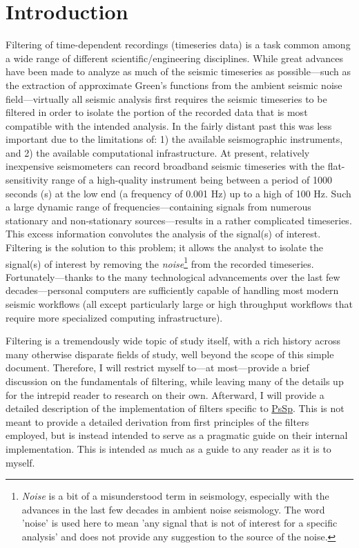 \documentclass[american, twoside]{article}
\begin{document}
\section{Introduction} \label{Introduction}
Filtering of time-dependent recordings (timeseries data) is a task common among a wide range of different scientific/engineering disciplines.
While great advances have been made to analyze as much of the seismic timeseries as possible---such as the extraction of approximate
Green's functions from the ambient seismic noise field---virtually all seismic analysis first requires the seismic timeseries to
be filtered in order to isolate the portion of the recorded data that is most compatible with the intended analysis. In the fairly
distant past this was less important due to the limitations of: 1) the available seismographic instruments, and 2) the available
computational infrastructure. At present, relatively inexpensive seismometers can record broadband seismic timeseries with the flat-sensitivity
range of a high-quality instrument being between a period of 1000 seconds (s) at the low end (a frequency of 0.001 Hz) up to a high
of 100 Hz. Such a large dynamic range of frequencies---containing signals from numerous stationary and non-stationary sources---results in a
rather complicated timeseries. This excess information convolutes the analysis of the signal(s) of interest.
Filtering is the solution to this problem; it allows the analyst to isolate the signal(s) of interest by removing the \textit{noise}\footnote{\textit{Noise} is a bit of a misunderstood term in
seismology, especially with the advances in the last few decades in ambient noise seismology. The word 'noise' is used here to mean 'any
signal that is not of interest for a specific analysis' and does not provide any suggestion to the source of the noise.} from the
recorded timeseries. Fortunately---thanks to the many technological advancements over the last few decades---personal computers are sufficiently
capable of handling most modern seismic workflows (all except particularly large or high throughput workflows that require more specialized
computing infrastructure).

Filtering is a tremendously wide topic of study itself, with a rich history across many otherwise disparate fields of study, well
beyond the scope of this simple document. Therefore, I will restrict myself to---at most---provide a brief discussion
on the fundamentals of filtering, while leaving many of the details up for the intrepid reader to research on their own. Afterward,
I will provide a detailed description of the implementation of filters specific to \href{https://github.com/arbCoding/PsSp}{PsSp}.
This is not meant to provide a detailed derivation from first principles of the filters employed, but is instead intended to serve as
a pragmatic guide on their internal implementation. This is intended as much as a guide to any reader as it is to myself.
\end{document}
